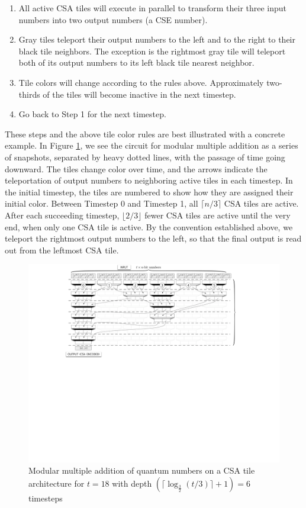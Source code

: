 \begin{enumerate}
\item
All active CSA tiles will execute in
parallel to transform their three input numbers into two output numbers
(a CSE number).
\item
Gray tiles teleport their output numbers to the left and to the right to
their black tile neighbors. The exception is the rightmost gray tile will
teleport both of its output numbers to its left black tile nearest neighbor.
\item
Tile colors will change according to the rules above. Approximately
two-thirds of the tiles will
become inactive in the next timestep.
\item
Go back to Step 1 for the next timestep.
\end{enumerate}

These steps and the above tile color rules are best illustrated with a concrete
example. In Figure \ref{fig:mod-mult}, we see the circuit for modular
multiple addition as a series of
snapshots, separated by heavy dotted lines, with the passage of time going
downward. The tiles change color over time, and the arrows indicate the
teleportation of output numbers to neighboring active tiles in each timestep.
In the initial timestep, the tiles are numbered to show how they are assigned
their initial color.
Between Timestep 0 and Timestep 1,
all $\lceil n/3 \rceil$ CSA tiles are active. After each succeeding timestep,
$\lfloor 2/3 \rfloor$
fewer CSA tiles are active until the very end, when only one CSA tile is
active. By the convention established above,
we teleport the rightmost output numbers to the left, so that the
final output is read out from the leftmost CSA tile.

\begin{figure}[htb!]
\centerline{
\includegraphics[width=6.5in]{figures/mod-mult-add.pdf}
}
\caption{Modular multiple addition of quantum numbers on a CSA tile
architecture for $t=18$ with depth $(\lceil \log_{\frac{3}{2}}(t/3) \rceil + 1) = 6$
timesteps}
\label{fig:mod-mult}
\end{figure}
%

